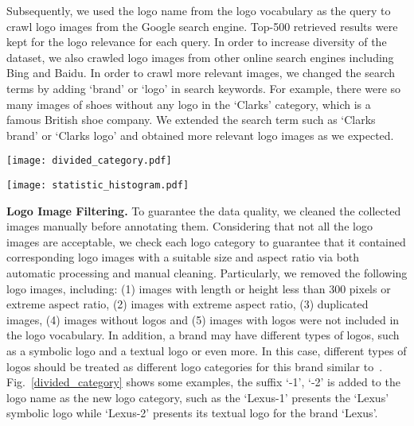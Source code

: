 \documentclass[journal]{IEEEtran}
\begin{document}
Subsequently, we used the logo name from the logo vocabulary as the query to crawl logo images from the Google search engine. Top-500 retrieved results were kept for the logo relevance for each query. In order to increase diversity of the dataset, we also crawled logo images from other online search engines including Bing and Baidu. In order to crawl more relevant images, we changed the search terms by adding `brand' or `logo' in search keywords. For example, there were so many images of shoes without any logo in the `Clarks' category, which is a famous British shoe company. We extended the search term such as `Clarks brand' or `Clarks logo' and obtained more relevant logo images as we expected.
\begin{figure*}[!t]
	\centering
	\texttt{[image: divided\_category.pdf]}
	\caption{Multiple logo categories for some brands, where a distinction between these logo categories via adding the suffix `-1', `-2'.}
	\label{divided_category}
\end{figure*}
\begin{figure*}[!t]
	\centering
	\texttt{[image: statistic\_histogram.pdf]}
	\caption{Sorted distribution of images for each logo in LogoDet-3K.}
	\label{statistic_histogram}
\end{figure*}

\textbf{Logo Image Filtering.} To guarantee the data quality, we cleaned the collected images manually before annotating them. Considering that not all the logo images are acceptable,  we check each logo category to guarantee that  it contained corresponding logo images with a suitable size and aspect ratio via  both automatic processing and manual cleaning. Particularly, we removed the following logo images, including: (1) images with  length or height  less than 300 pixels or extreme aspect ratio, (2) images with extreme aspect ratio, (3) duplicated images, (4) images without logos and (5) images with logos were not included in the logo vocabulary. In addition, a brand may have different types of logos, such as a symbolic logo and a textual logo or even more.  In this case, different types of logos should be treated as different logo categories for this brand similar to~\cite{Andras2017Open}. Fig.~\ref{divided_category} shows some examples, the suffix `-1', `-2' is added to the logo name as the new logo category, such as the `Lexus-1' presents the `Lexus' symbolic logo while `Lexus-2' presents its textual logo for the brand  `Lexus'.
\end{document}
